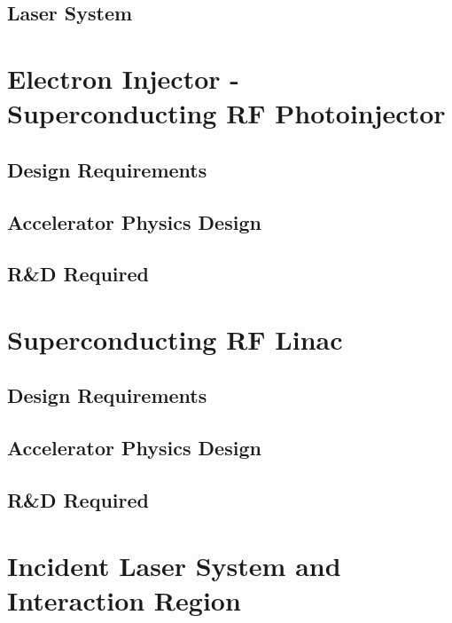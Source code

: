 \documentclass[10pt]{article}
\newcommand{\blankline}{\quad\pagebreak[3]}
\begin{document}
  \subsection{Laser System}
  
  
\blankline
\blankline
  
\section{Electron Injector - Superconducting RF Photoinjector}

  \subsection{Design Requirements}
  
  \subsection{Accelerator Physics Design}
  
  \subsection{R\&D Required}  


\blankline
\blankline

\section{Superconducting RF Linac}

  \subsection{Design Requirements}
  
  \subsection{Accelerator Physics Design}
  
  \subsection{R\&D Required}  


\blankline
\blankline

\section{Incident Laser System and Interaction Region}
\end{document}
